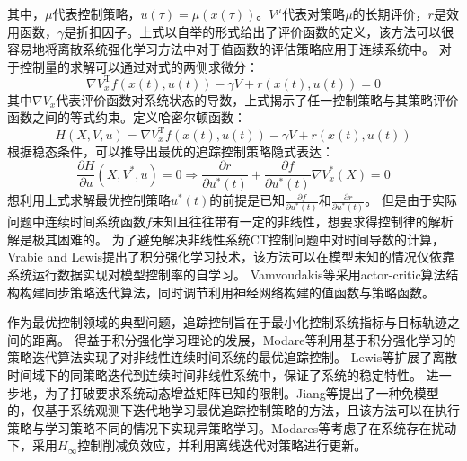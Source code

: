 其中，$\mu$代表控制策略，$u(\tau)=\mu(x(\tau))$。$V^{\mu}$代表对策略$\mu$的长期评价，$r$是效用函数，$\gamma$是折扣因子。上式以自举的形式给出了评价函数的定义，该方法可以很容易地将离散系统强化学习方法中对于值函数的评估策略应用于连续系统中。
对于控制量的求解可以通过对式的两侧求微分：
\begin{equation}
    \nabla V_x^{\mathrm{T}} f(x(t), u(t))-\gamma V+r(x(t), u(t))=0
\end{equation}
其中$\nabla V_x$代表评价函数对系统状态的导数，上式揭示了任一控制策略与其策略评价函数之间的等式约束。定义哈密尔顿函数：
\begin{equation}
    H(X, V, u)=\nabla V_x^{\mathrm{T}} f(x(t), u(t))-\gamma V+r(x(t), u(t))
\end{equation}
根据稳态条件，可以推导出最优的追踪控制策略隐式表达：
\begin{equation}
    \frac{\partial H}{\partial u}\left(X, V^*, u\right)=0 \Rightarrow \frac{\partial r}{\partial u^*(t)}+\frac{\partial f}{\partial u^*(t)} \nabla V_x^*(X)=0
\end{equation}
想利用上式求解最优控制策略$u^*(t)$的前提是已知$\frac{\partial f}{\partial u^*(t)}$和$\frac{\partial r}{\partial u^*(t)}$。
但是由于实际问题中连续时间系统函数$f$未知且往往带有一定的非线性，想要求得控制律的解析解是极其困难的。
为了避免解决非线性系统CT控制问题中对时间导数的计算，Vrabie and Lewis\cite{vrabie2009neural}提出了积分强化学习技术，该方法可以在模型未知的情况仅依靠系统运行数据实现对模型控制率的自学习。
Vamvoudakis等\cite{vamvoudakis2014online}采用actor-critic算法结构构建同步策略迭代算法，同时调节利用神经网络构建的值函数与策略函数。

作为最优控制领域的典型问题，追踪控制旨在于最小化控制系统指标与目标轨迹之间的距离。
得益于积分强化学习理论的发展，Modare等\cite{modares2014linear}利用基于积分强化学习的策略迭代算法实现了对非线性连续时间系统的最优追踪控制。
Lewis等\cite{modares2014optimal}扩展了离散时间域下的同策略迭代到连续时间非线性系统中，保证了系统的稳定特性。
进一步地，为了打破要求系统动态增益矩阵已知的限制。Jiang等\cite{jiang2012computational}提出了一种免模型的，仅基于系统观测下迭代地学习最优追踪控制策略的方法，且该方法可以在执行策略与学习策略不同的情况下实现异策略学习。Modares等\cite{modares2015h}考虑了在系统存在扰动下，采用$H_{\infty}$控制削减负效应，并利用离线迭代对策略进行更新。

